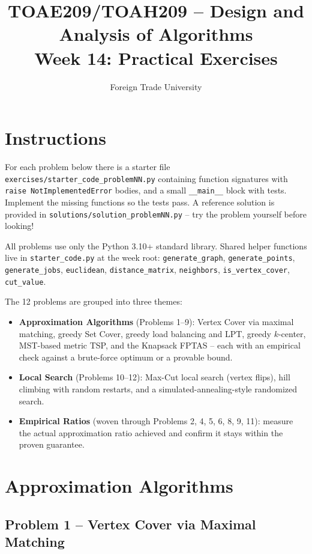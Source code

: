 \documentclass[11pt]{article}
\title{TOAE209/TOAH209 -- Design and Analysis of Algorithms\\[4pt]
\large Week 14: Practical Exercises}
\author{Foreign Trade University}
\date{}
\begin{document}
\maketitle

\section*{Instructions}

For each problem below there is a starter file
\texttt{exercises/starter\_code\_problemNN.py} containing function signatures with
\texttt{raise NotImplementedError} bodies, and a small \texttt{\_\_main\_\_} block with
tests. Implement the missing functions so the tests pass. A reference solution is
provided in \texttt{solutions/solution\_problemNN.py} -- try the problem yourself before
looking!

All problems use only the Python 3.10+ standard library. Shared helper functions live in
\texttt{starter\_code.py} at the week root: \texttt{generate\_graph},
\texttt{generate\_points}, \texttt{generate\_jobs}, \texttt{euclidean},
\texttt{distance\_matrix}, \texttt{neighbors}, \texttt{is\_vertex\_cover},
\texttt{cut\_value}.

The 12 problems are grouped into three themes:
\begin{itemize}
    \item \textbf{Approximation Algorithms} (Problems 1--9): Vertex Cover via maximal
    matching, greedy Set Cover, greedy load balancing and LPT, greedy $k$-center, MST-based
    metric TSP, and the Knapsack FPTAS -- each with an empirical check against a brute-force
    optimum or a provable bound.
    \item \textbf{Local Search} (Problems 10--12): Max-Cut local search (vertex flips),
    hill climbing with random restarts, and a simulated-annealing-style randomized search.
    \item \textbf{Empirical Ratios} (woven through Problems 2, 4, 5, 6, 8, 9, 11): measure
    the actual approximation ratio achieved and confirm it stays within the proven
    guarantee.
\end{itemize}

\newpage
\section{Approximation Algorithms}

\subsection*{Problem 1 -- Vertex Cover via Maximal Matching}
\end{document}
